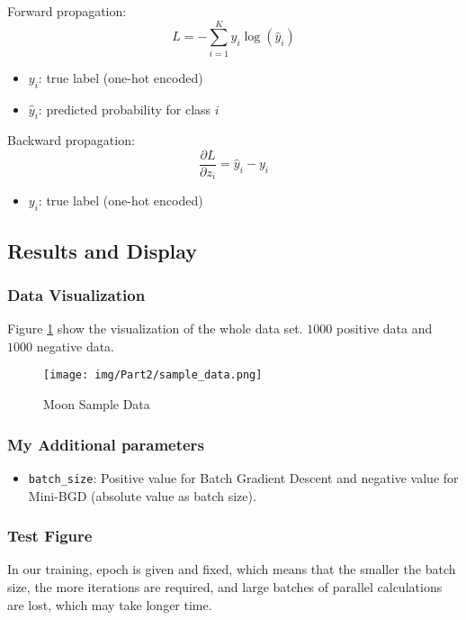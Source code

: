   Forward propagation:
  $$ L = -\sum_{i=1}^{K} y_i \log(\hat{y}_i) $$

  \begin{itemize}
    \item $y_i$: true label (one-hot encoded)
    \item $\hat{y}_i$: predicted probability for class $i$
  \end{itemize}

  Backward propagation:
  $$ \frac{\partial L}{\partial z_i} = \hat{y}_i - y_i $$

  \begin{itemize}
    \item  $y_i$: true label (one-hot encoded)
  \end{itemize}

  \subsection{Results and Display}

  \subsubsection{Data Visualization}

  Figure \ref{fig:p2sample} show the visualization of the whole data set.
  $1000$ positive data and $1000$ negative data.

  \begin{figure}[!ht]
    \centering
    \texttt{[image: img/Part2/sample\_data.png]}
    \caption{Moon Sample Data}
    \label{fig:p2sample}
  \end{figure}

  \subsubsection{My Additional parameters}

  \begin{itemize}
    \item \texttt{batch\_size}: Positive value for Batch Gradient Descent and negative value for Mini-BGD (absolute value as batch size).
  \end{itemize}

  \subsubsection{Test Figure}

  In our training, epoch is given and fixed, which means that the smaller the batch size, the more iterations are required,
  and large batches of parallel calculations are lost, which may take longer time.

